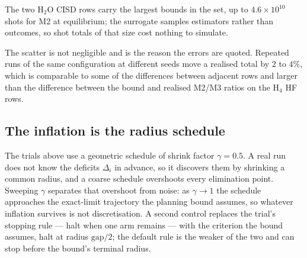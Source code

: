 \documentclass[10pt]{article}
\begin{document}
The two H$_2$O CISD rows carry the largest bounds in the set, up to
$4.6\times10^{10}$ shots for M2 at equilibrium; the surrogate samples estimators
rather than outcomes, so shot totals of that size cost nothing to simulate.

The scatter is not negligible and is the reason the errors are quoted. Repeated runs of the same configuration at different seeds move a realised total by $2$ to $4\%$, which is comparable to some of the differences between adjacent rows and larger than the difference between the bound and realised M2/M3 ratios on the H$_4$ HF rows.

\subsection{The inflation is the radius schedule}
\label{sec:gamma}

The trials above use a geometric schedule of shrink factor $\gamma=0.5$. A real
run does not know the deficits $\Delta_i$ in advance, so it discovers them by
shrinking a common radius, and a coarse schedule overshoots every elimination
point. Sweeping $\gamma$ separates that overshoot from noise: as $\gamma\to1$ the
schedule approaches the exact-limit trajectory the planning bound assumes, so
whatever inflation survives is not discretisation. A second control replaces the
trial's stopping rule --- halt when one arm remains --- with the criterion the
bound assumes, halt at radius $\mathrm{gap}/2$; the default rule is the weaker of
the two and can stop before the bound's terminal radius.
\end{document}

